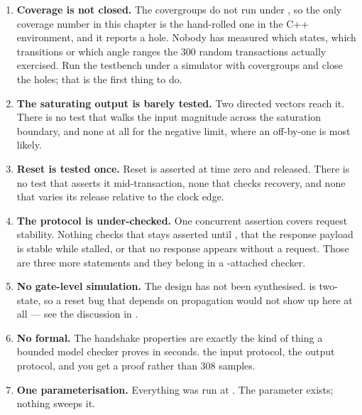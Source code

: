 \begin{enumerate}
  \item \textbf{Coverage is not closed.} The covergroups do not run under
        , so the only coverage number in this chapter is the
        hand-rolled one in the C++ environment, and it reports a hole. Nobody
        has measured which states, which transitions or which angle ranges the
        300 random transactions actually exercised. Run the \SV{} testbench
        under a simulator with covergroups and close the holes; that is the
        first thing to do.

  \item \textbf{The saturating output is barely tested.} Two directed vectors
        reach it. There is no test that walks the input magnitude across the
        saturation boundary, and none at all for the negative limit, where an
        off-by-one is most likely.

  \item \textbf{Reset is tested once.} Reset is asserted at time zero and
        released. There is no test that asserts it mid-transaction, none that
        checks recovery, and none that varies its release relative to the
        clock edge.

  \item \textbf{The protocol is under-checked.} One concurrent assertion
        covers request stability. Nothing checks that 
        stays asserted until , that the response payload
        is stable while stalled, or that no response appears without a
        request. Those are three more  statements and
        they belong in a -attached checker.

  \item \textbf{No gate-level simulation.} The design has not been
        synthesised.  is two-state, so a reset bug that
        depends on  propagation would not show up here at all --- see
        the  discussion in .

  \item \textbf{No formal.} The handshake properties are exactly the kind of
        thing a bounded model checker proves in seconds.  the
        input protocol,  the output protocol, and you get a
        proof rather than 308 samples.

  \item \textbf{One parameterisation.} Everything was run at
        . The parameter exists; nothing sweeps it.
\end{enumerate}

